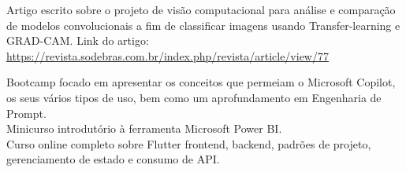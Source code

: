 \documentclass[
    10pt,
    english,
]{article}
\begin{document}

{Artigo escrito sobre o projeto de visão computacional para análise e comparação de modelos convolucionais a fim de classificar imagens usando Transfer-learning e GRAD-CAM. Link do artigo: \url{https://revista.sodebras.com.br/index.php/revista/article/view/77}}


{Bootcamp focado em apresentar os conceitos que permeiam o Microsoft Copilot, os seus vários tipos de uso, bem como um aprofundamento em Engenharia de Prompt.}
\\
\noindent {}
{Minicurso introdutório à ferramenta Microsoft Power BI.}
\\
\noindent {}
{Curso online completo sobre Flutter frontend, backend, padrões de projeto, gerenciamento de estado e consumo de API.}

\end{document}
